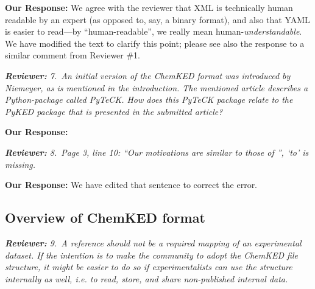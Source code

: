 \documentclass[a4paper,10pt]{elsarticle}
\newenvironment{reviewer}{\vspace{0.5\baselineskip}\begingroup\itshape\textbf{Reviewer:}}{\endgroup\vspace{0.5\baselineskip}}
\newenvironment{response}{\vspace{0.5\baselineskip}\textbf{Our Response:}}{\vspace{0.5\baselineskip}}
\begin{document}
\begin{response}
    We agree with the reviewer that XML is technically human readable by an expert (as opposed to,
    say, a binary format), and also that YAML is easier to read---by ``human-readable'', we really
    mean human-\emph{understandable}. We have modified the text to clarify this point; please see
    also the response to a similar comment from Reviewer \#1.
\end{response}

\begin{reviewer}
    7.~An initial version of the ChemKED format was introduced by Niemeyer, as is mentioned in the
    introduction. The mentioned article describes a Python-package called PyTeCK. How does this
    PyTeCK package relate to the PyKED package that is presented in the submitted article?
\end{reviewer}

\begin{response}

\end{response}

\begin{reviewer}
    8.~Page 3, line 10: ``Our motivations are similar to those of '', `to' is missing.
\end{reviewer}

\begin{response}
    We have edited that sentence to correct the error.
\end{response}

\subsection*{Overview of ChemKED format}

\begin{reviewer}
    9.~A reference should not be a required mapping of an experimental dataset. If the intention is
    to make the community to adopt the ChemKED file structure, it might be easier to do so if
    experimentalists can use the structure internally as well, i.e. to read, store, and share
    non-published internal data.
\end{reviewer}
\end{document}
